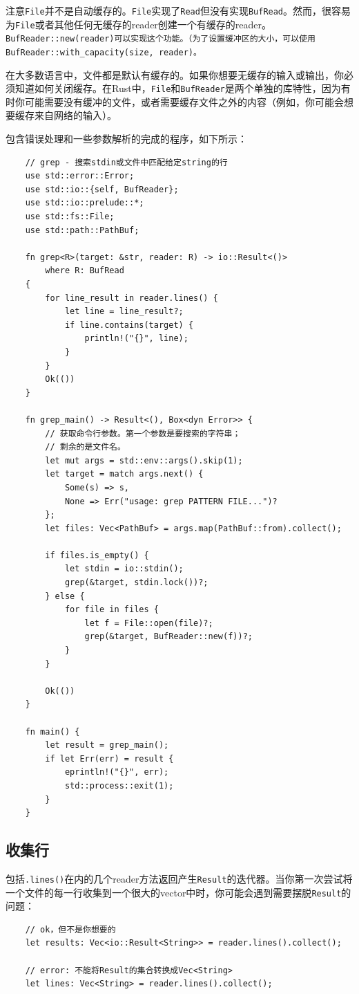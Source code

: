 注意\texttt{File}并不是自动缓存的。\texttt{File}实现了\texttt{Read}但没有实现\texttt{BufRead}。然而，很容易为\texttt{File}或者其他任何无缓存的reader创建一个有缓存的reader。\texttt{BufReader::new(reader)可以实现这个功能。（为了设置缓冲区的大小，可以使用\texttt{BufReader::with\_capacity(size, reader)}。}

在大多数语言中，文件都是默认有缓存的。如果你想要无缓存的输入或输出，你必须知道如何关闭缓存。在Rust中，\texttt{File}和\texttt{BufReader}是两个单独的库特性，因为有时你可能需要没有缓冲的文件，或者需要缓存文件之外的内容（例如，你可能会想要缓存来自网络的输入）。

包含错误处理和一些参数解析的完成的程序，如下所示：
\begin{verbatim}
    // grep - 搜索stdin或文件中匹配给定string的行
    use std::error::Error;
    use std::io::{self, BufReader};
    use std::io::prelude::*;
    use std::fs::File;
    use std::path::PathBuf;

    fn grep<R>(target: &str, reader: R) -> io::Result<()>
        where R: BufRead
    {
        for line_result in reader.lines() {
            let line = line_result?;
            if line.contains(target) {
                println!("{}", line);
            }
        }
        Ok(())
    }

    fn grep_main() -> Result<(), Box<dyn Error>> {
        // 获取命令行参数。第一个参数是要搜索的字符串；
        // 剩余的是文件名。
        let mut args = std::env::args().skip(1);
        let target = match args.next() {
            Some(s) => s,
            None => Err("usage: grep PATTERN FILE...")?
        };
        let files: Vec<PathBuf> = args.map(PathBuf::from).collect();

        if files.is_empty() {
            let stdin = io::stdin();
            grep(&target, stdin.lock())?;
        } else {
            for file in files {
                let f = File::open(file)?;
                grep(&target, BufReader::new(f))?;
            }
        }

        Ok(())
    }

    fn main() {
        let result = grep_main();
        if let Err(err) = result {
            eprintln!("{}", err);
            std::process::exit(1);
        }
    }
\end{verbatim}

\subsection{收集行}
包括\texttt{.lines()}在内的几个reader方法返回产生\texttt{Result}的迭代器。当你第一次尝试将一个文件的每一行收集到一个很大的vector中时，你可能会遇到需要摆脱\texttt{Result}的问题：
\begin{verbatim}
    // ok，但不是你想要的
    let results: Vec<io::Result<String>> = reader.lines().collect();

    // error: 不能将Result的集合转换成Vec<String>
    let lines: Vec<String> = reader.lines().collect();
\end{verbatim}

